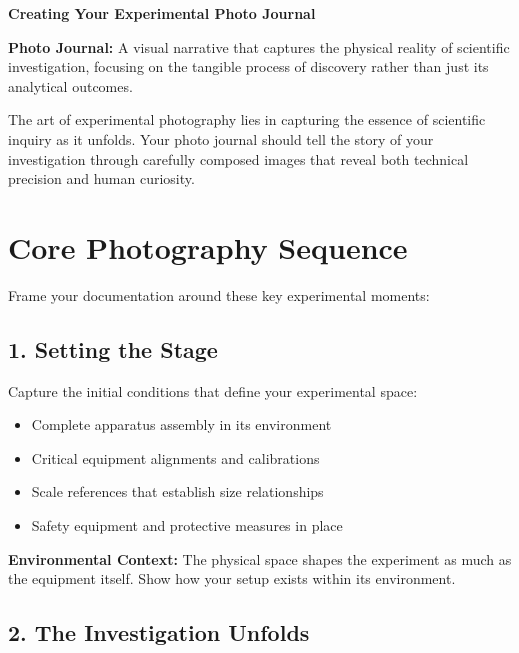 \documentclass[11pt]{article}
\begin{document}
\begin{center}
\LARGE\textbf{Creating Your Experimental Photo Journal}
\end{center}

\vspace{1em}

\begin{conceptbox}
\textbf{Photo Journal:} A visual narrative that captures the physical reality of scientific investigation, focusing on the tangible process of discovery rather than just its analytical outcomes.
\end{conceptbox}

The art of experimental photography lies in capturing the essence of scientific inquiry as it unfolds. Your photo journal should tell the story of your investigation through carefully composed images that reveal both technical precision and human curiosity.

\section*{Core Photography Sequence}

Frame your documentation around these key experimental moments:

\subsection*{1. Setting the Stage}

Capture the initial conditions that define your experimental space:
\begin{itemize}[leftmargin=*]
    \item Complete apparatus assembly in its environment
    \item Critical equipment alignments and calibrations
    \item Scale references that establish size relationships
    \item Safety equipment and protective measures in place
\end{itemize}

\begin{conceptbox}
\textbf{Environmental Context:} The physical space shapes the experiment as much as the equipment itself. Show how your setup exists within its environment.
\end{conceptbox}

\subsection*{2. The Investigation Unfolds}
\end{document}

